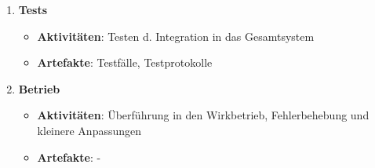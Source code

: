 \begin{enumerate}
    \item  \textbf{Tests}
    \begin{itemize}
        \item \textbf{Aktivitäten}: Testen d. Integration in das Gesamtsystem
        \item \textbf{Artefakte}: Testfälle, Testprotokolle
    \end{itemize}

    \item  \textbf{Betrieb}
    \begin{itemize}
        \item \textbf{Aktivitäten}: Überführung in den Wirkbetrieb, Fehlerbehebung und kleinere Anpassungen
        \item \textbf{Artefakte}: -
    \end{itemize}
\end{enumerate}

